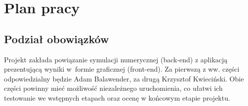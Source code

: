 
\section{Plan pracy}
\subsection{Podział obowiązków}
Projekt zakłada powiązanie symulacji numerycznej (back-end) z aplikacją prezentującą wyniki w~formie graficznej (front-end). Za pierwszą z ww. części odpowiedzialny będzie Adam
Balawender, za drugą Krzysztof Kwieciński. Obie części powinny mieć możliwość niezależnego uruchomienia, co ułatwi ich testowanie we wstępnych etapach oraz ocenę w końcowym etapie projektu.

